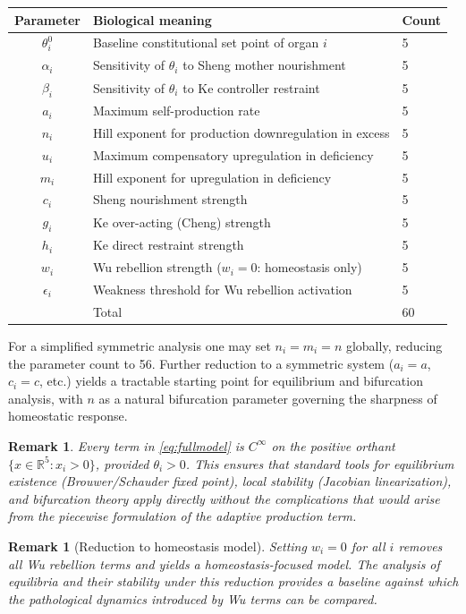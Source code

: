 \documentclass{article}
\newtheorem{remark}[theorem]{Remark}
\begin{document}
\begin{center}
\begin{tabular}{cll}
\toprule
Parameter & Biological meaning & Count \\
\midrule
$\theta_i^0$ & Baseline constitutional set point of organ $i$ & 5 \\
$\alpha_i$   & Sensitivity of $\theta_i$ to Sheng mother nourishment & 5 \\
$\beta_i$    & Sensitivity of $\theta_i$ to Ke controller restraint & 5 \\
$a_i$        & Maximum self-production rate & 5 \\
$n_i$        & Hill exponent for production downregulation in excess & 5 \\
$u_i$        & Maximum compensatory upregulation in deficiency & 5 \\
$m_i$        & Hill exponent for upregulation in deficiency & 5 \\
$c_i$        & Sheng nourishment strength & 5 \\
$g_i$        & Ke over-acting (Cheng) strength & 5 \\
$h_i$        & Ke direct restraint strength & 5 \\
$w_i$        & Wu rebellion strength ($w_i = 0$: homeostasis only) & 5 \\
$\epsilon_i$ & Weakness threshold for Wu rebellion activation & 5 \\
\midrule
 & Total & 60 \\
\bottomrule
\end{tabular}
\end{center}

\noindent
For a simplified symmetric analysis one may set $n_i = m_i = n$ globally,
reducing the parameter count to 56. Further reduction to a symmetric system
($a_i = a$, $c_i = c$, etc.) yields a tractable starting point for equilibrium
and bifurcation analysis, with $n$ as a natural bifurcation parameter governing
the sharpness of homeostatic response.

\begin{remark}
Every term in \eqref{eq:fullmodel} is $C^\infty$ on the positive orthant
$\{x \in \mathbb{R}^5 : x_i > 0\}$, provided $\theta_i > 0$. This ensures that
standard tools for equilibrium existence (Brouwer/Schauder fixed point), local
stability (Jacobian linearization), and bifurcation theory apply directly without
the complications that would arise from the piecewise formulation of the adaptive
production term.
\end{remark}

\begin{remark}[Reduction to homeostasis model]
Setting $w_i = 0$ for all $i$ removes all Wu rebellion terms and yields a
homeostasis-focused model. The analysis of equilibria and their stability under
this reduction provides a baseline against which the pathological dynamics
introduced by Wu terms can be compared.
\end{remark}
\end{document}
